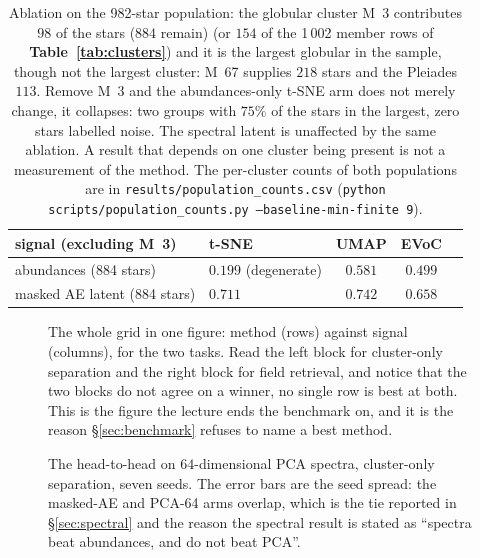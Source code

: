 \begin{table}[htbp]
\centering
\small
{}
\begin{tabular}{@{}llccc@{}}
\toprule
signal (excluding M~3) & t-SNE & UMAP & EVoC \\
\midrule
abundances (884 stars)              & $0.199$ (degenerate) & $0.581$ & $0.499$ \\
masked AE latent (884 stars)        & $0.711$ & $0.742$ & $0.658$ \\
\bottomrule
\end{tabular}
\caption{Ablation on the 982-star population: the globular cluster M~3
contributes $98$ of the stars ($884$ remain) (or $154$ of the 1\,002 member
rows of \textbf{Table~\ref{tab:clusters}}) and it is the largest globular in
the sample, though not the largest cluster: M~67 supplies $218$ stars and the
Pleiades $113$. Remove M~3 and the abundances-only t-SNE arm does not merely
change, it collapses: two groups with $75\%$ of the stars in the largest, zero
stars labelled noise. The spectral latent is unaffected by the same ablation. A
result that depends on one cluster being present is not a measurement of the
method. The per-cluster counts of both populations are in
\texttt{results/population\_counts.csv} (\texttt{python
scripts/population\_counts.py --baseline-min-finite 9}).}
\label{tab:ablation}
\end{table}

\begin{figure}[htbp]\centering
  \caption{The whole grid in one figure: method (rows) against signal
  (columns), for the two tasks. Read the left block for cluster-only separation
  and the right block for field retrieval, and notice that the two blocks do
  not agree on a winner, no single row is best at both. This is the figure the
  lecture ends the benchmark on, and it is the reason \S\ref{sec:benchmark}
  refuses to name a best method.}
  \label{fig:benchgrid}
\end{figure}

\begin{figure}[htbp]\centering
  \caption{The head-to-head on $64$-dimensional PCA spectra, cluster-only
  separation, seven seeds. The error bars are the seed spread: the masked-AE
  and PCA-64 arms overlap, which is the tie reported in
  \S\ref{sec:spectral} and the reason the spectral result is stated as
  ``spectra beat abundances, and do not beat PCA''.}
  \label{fig:headtohead}
\end{figure}

